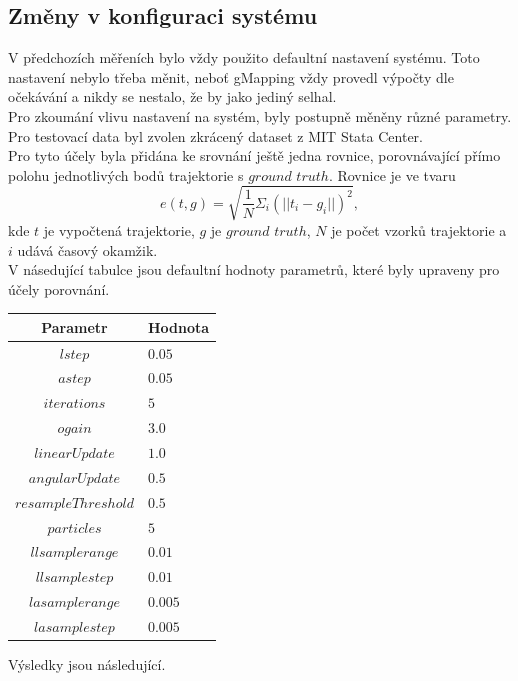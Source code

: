 \documentclass[12pt]{article}
\begin{document}
\subsection{Změny v konfiguraci systému}
V předchozích měřeních bylo vždy použito defaultní nastavení systému. Toto nastavení nebylo třeba měnit, neboť gMapping vždy provedl výpočty dle očekávání a nikdy se nestalo, že by jako jediný selhal.\\
\indent Pro zkoumání vlivu nastavení na systém, byly postupně měněny různé parametry. Pro testovací data byl zvolen zkrácený dataset z MIT Stata Center.\\
\indent Pro tyto účely byla přidána ke srovnání ještě jedna rovnice, porovnávající přímo polohu jednotlivých bodů trajektorie s $ground$ $truth$. Rovnice je ve tvaru
\begin{equation}
	e(t,g)=\sqrt{\frac{1}{N}\Sigma_i(||t_i-g_i||)^2},
\end{equation}
kde $t$ je vypočtená trajektorie, $g$ je $ground$ $truth$, $N$ je počet vzorků trajektorie a $i$ udává časový okamžik.\\
\indent V násedující tabulce jsou defaultní hodnoty parametrů, které byly upraveny pro účely porovnání.
\begin{center}
	\begin{tabular}{c|p{3cm}}
		\bfseries Parametr  & \bfseries Hodnota  \\ [2mm]
		\hline
		$lstep$ & $0.05$ \\
		$astep$ & $0.05$ \\
		$iterations$ & $5$ \\
		$ogain$ & $3.0$ \\
		$linearUpdate$ & $1.0$ \\
		$angularUpdate$ & $0.5$ \\
		$resampleThreshold$ & $0.5$ \\
		$particles$ & $5$ \\
		$llsamplerange$ & $0.01$ \\
		$llsamplestep$ & $0.01$ \\
		$lasamplerange$ & $0.005$ \\
		$lasamplestep$ & $0.005$ \\
	\end{tabular}
\end{center}
\newpage
Výsledky jsou následující.
\end{document}

